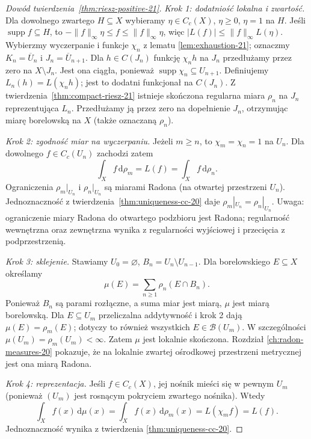 \documentclass[11pt,a4paper,oneside]{book}
\numberwithin{equation}{chapter}
\theoremstyle{plain}
\theoremstyle{definition}
\theoremstyle{remark}
\begin{document}
\begin{proof}[Dowód twierdzenia~\ref{thm:riesz-positive-21}]
\emph{Krok 1: dodatniość lokalna i zwartość.}
Dla dowolnego zwartego $H\subseteq X$ wybieramy
$\eta\in C_c(X)$, $\eta\ge0$, $\eta=1$ na $H$.
Jeśli $\operatorname{supp}f\subseteq H$, to
$-\|f\|_\infty\eta\le f\le\|f\|_\infty\eta$,
więc $|L(f)|\le\|f\|_\infty L(\eta)$.
Wybierzmy wyczerpanie i funkcje $\chi_n$ z lematu
\ref{lem:exhaustion-21}; oznaczmy $K_n=\overline U_n$
i $J_n=\overline U_{n+1}$.
Dla $h\in C(J_n)$ funkcję $\chi_nh$ na $J_n$
przedłużamy przez zero na $X\setminus J_n$.
Jest ona ciągła, ponieważ
$\operatorname{supp}\chi_n\subseteq U_{n+1}$.
Definiujemy $L_n(h)=L(\chi_nh)$; jest to dodatni
funkcjonał na $C(J_n)$.
Z twierdzenia~\ref{thm:compact-riesz-21}
istnieje skończona regularna miara $\rho_n$
na $J_n$ reprezentująca $L_n$. Przedłużamy ją
przez zero na dopełnienie $J_n$, otrzymując miarę
borelowską na $X$ (także oznaczaną $\rho_n$).

\emph{Krok 2: zgodność miar na wyczerpaniu.}
Jeżeli $m\ge n$, to $\chi_m=\chi_n=1$ na $U_n$.
Dla dowolnego $f\in C_c(U_n)$ zachodzi zatem
\[
 \int_Xf\,\mathrm d\rho_m=L(f)
  =\int_Xf\,\mathrm d\rho_n.
\]
Ograniczenia $\rho_m|_{U_n}$ i $\rho_n|_{U_n}$
są miarami Radona (na otwartej przestrzeni $U_n$).
Jednoznaczność z twierdzenia~\ref{thm:uniqueness-cc-20}
daje $\rho_m|_{U_n}=\rho_n|_{U_n}$.
Uwaga: ograniczenie miary Radona do otwartego podzbioru
jest Radona; regularność wewnętrzna oraz zewnętrzna
wynika z regularności wyjściowej i przecięcia z podprzestrzenią.

\emph{Krok 3: sklejenie.}
Stawiamy $U_0=\varnothing$, $B_n=U_n\setminus U_{n-1}$.
Dla borelowskiego $E\subseteq X$ określamy
\begin{equation}\label{eq:gluing-measures-21}
 \mu(E)=\sum_{n\ge1}\rho_n(E\cap B_n).
\end{equation}
Ponieważ $B_n$ są parami rozłączne, a suma miar jest
miarą, $\mu$ jest miarą borelowską. Dla $E\subseteq U_m$
przeliczalna addytywność i krok 2 dają
$\mu(E)=\rho_m(E)$; dotyczy to również wszystkich
$E\in\mathcal B(U_m)$. W szczególności
$\mu(U_m)=\rho_m(U_m)<\infty$.
Zatem $\mu$ jest lokalnie skończona. Rozdział
\ref{ch:radon-measures-20} pokazuje, że na lokalnie
zwartej ośrodkowej przestrzeni metrycznej jest ona
miarą Radona.

\emph{Krok 4: reprezentacja.}
Jeśli $f\in C_c(X)$, jej nośnik mieści się w pewnym
$U_m$ (ponieważ $(U_m)$ jest rosnącym pokryciem
zwartego nośnika). Wtedy
\[
 \int_X f(x)\,\mathrm d\mu(x)
 =\int_X f(x)\,\mathrm d\rho_m(x)
 =L(\chi_m f)=L(f).
\]
Jednoznaczność wynika z twierdzenia
\ref{thm:uniqueness-cc-20}.
\end{proof}
\end{document}
